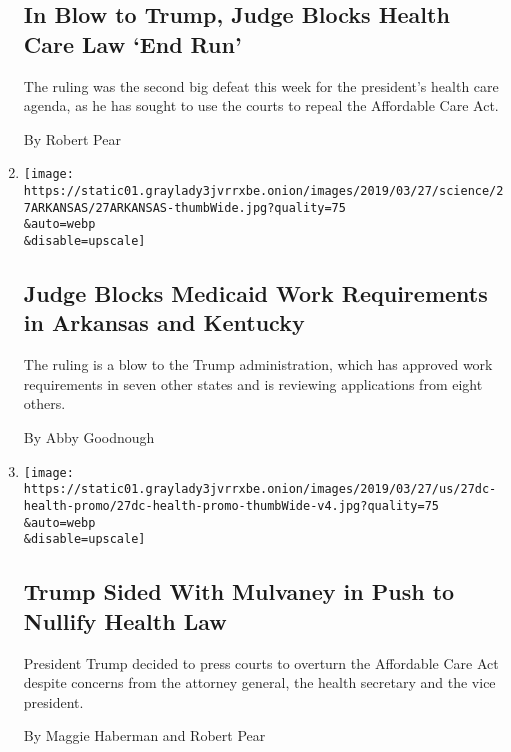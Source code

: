 \begin{enumerate}
{  \subsection{In Blow to Trump, Judge Blocks Health Care Law `End
  Run'}\label{in-blow-to-trump-judge-blocks-health-care-law-end-run}}

  The ruling was the second big defeat this week for the president's
  health care agenda, as he has sought to use the courts to repeal the
  Affordable Care Act.

  By Robert Pear
\item
  \href{/2019/03/27/health/medicaid-work-requirement.html}{}

  \texttt{[image: https://static01.graylady3jvrrxbe.onion/images/2019/03/27/science/27ARKANSAS/27ARKANSAS-thumbWide.jpg?quality=75\\\&auto=webp\\\&disable=upscale]}

  \hypertarget{judge-blocks-medicaid-work-requirements-in-arkansas-and-kentucky}{%
  \subsection{Judge Blocks Medicaid Work Requirements in Arkansas and
  Kentucky}\label{judge-blocks-medicaid-work-requirements-in-arkansas-and-kentucky}}

  The ruling is a blow to the Trump administration, which has approved
  work requirements in seven other states and is reviewing applications
  from eight others.

  By Abby Goodnough
\item
  \href{/2019/03/27/us/politics/trump-aca.html}{}

  \texttt{[image: https://static01.graylady3jvrrxbe.onion/images/2019/03/27/us/27dc-health-promo/27dc-health-promo-thumbWide-v4.jpg?quality=75\\\&auto=webp\\\&disable=upscale]}

  \hypertarget{trump-sided-with-mulvaney-in-push-to-nullify-health-law}{%
  \subsection{Trump Sided With Mulvaney in Push to Nullify Health
  Law}\label{trump-sided-with-mulvaney-in-push-to-nullify-health-law}}

  President Trump decided to press courts to overturn the Affordable
  Care Act despite concerns from the attorney general, the health
  secretary and the vice president.

  By Maggie Haberman and Robert Pear
\end{enumerate}

